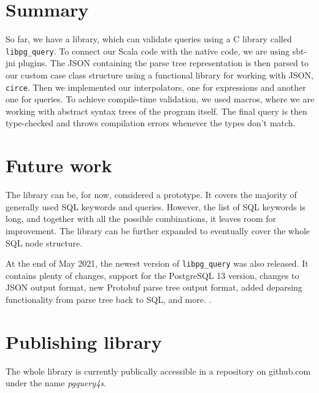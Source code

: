 \section{Summary}
So far, we have a library, which can validate queries using a C library called \texttt{libpg\_query}. To connect our Scala code with the native code, we are using sbt-jni plugins. The JSON containing the parse tree representation is then parsed to our custom case class structure using a functional library for working with JSON, \texttt{circe}. Then we implemented our interpolators, one for expressions and another one for queries. To achieve compile-time validation, we used macros, where we are working with abstract syntax trees of the program itself. The final query is then type-checked and throws compilation errors whenever the types don't match.

\section{Future work}
The library can be, for now, considered a prototype. It covers the majority of generally used SQL keywords and queries. However, the list of SQL keywords is long, and together with all the possible combinations, it leaves room for improvement. The library can be further expanded to eventually cover the whole SQL node structure. 

At the end of May 2021, the newest version of \texttt{libpg\_query} was also released. It contains plenty of changes, support for the PostgreSQL 13 version, changes to JSON output format, new Protobuf parse tree output format, added deparsing functionality from parse tree back to SQL, and more. \cite{libpgquery13}. 

\section{Publishing library}
The whole library is currently publically accessible in a repository on github.com under the name \textit{pgquery4s}. 